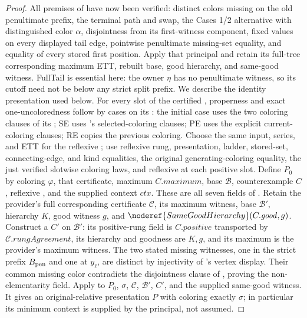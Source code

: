 \begin{proof}
All premises of  have now
been verified: distinct colors missing on the old penultimate prefix,
the terminal path and swap, the Cases 1/2 alternative with distinguished
color $\alpha$, disjointness from its first-witness component, fixed
values on every displayed tail edge, pointwise penultimate missing-set
equality, and equality of every stored first position. Apply that
principal and retain its full-tree corresponding maximum ETT, rebuilt
base, good hierarchy, and same-good witness. FullTail is essential
here: the owner $\eta$ has no penultimate witness, so its cutoff need
not be below any strict split prefix.
We describe the identity presentation used below. For every slot of
the certified , properness and exact
one-uncoloredness follow by cases on its
: the initial case uses the two coloring
clauses of its ; SE uses
's selected-coloring clauses; PE uses
the explicit current-coloring clauses; RE copies the previous coloring.
Choose the same input, series, and ETT for the reflexive
; use reflexive rung,
presentation, ladder, stored-set, connecting-edge, and kind equalities,
the original generating-coloring equality, the just verified slotwise
coloring laws, and reflexive  at each positive
slot. Define $P_0$ by coloring $\varphi$, that certificate, maximum
$C.\mathit{maximum}$, base $\mathcal B$, counterexample $C$, reflexive
, and the supplied context $\mathit{ctx}$.
These are all seven fields of
.
Retain the provider's full corresponding certificate $\mathcal C$,
its maximum witness, base $\mathcal B'$, hierarchy $K$, good witness
$g$, and $\noderef{SameGoodHierarchy}(C.\mathit{good},g)$.
Construct a  $C'$ on $\mathcal B'$:
its positive-rung field is $C.\mathit{positive}$ transported by
$\mathcal C.\mathit{rungAgreement}$, its hierarchy and goodness are
$K,g$, and its maximum is the provider's maximum witness.
The two stated missing witnesses, one in the strict prefix
$B_{\rm pen}$ and one at $y_\ell$, are distinct by injectivity of
's vertex display. Their common missing color
contradicts the disjointness clause of
, proving the non-elementarity
field. Apply  to $P_0$,
$\sigma$, $\mathcal C$, $\mathcal B'$, $C'$, and the supplied same-good
witness. It gives an original-relative presentation $P$ with coloring
exactly $\sigma$; in particular its minimum context is supplied by the
principal, not assumed.


\end{proof}
